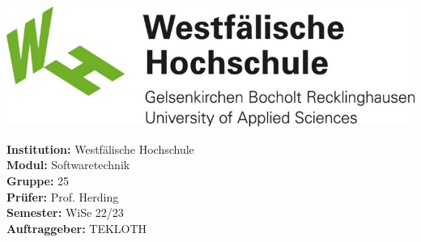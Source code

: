 \begin{titlepage}
    \maketitle
    \vspace{2cm}
    \begin{center}
        \includegraphics[width=\paperwidth/2]{../assets/img/whs}
    \end{center}
    \vspace*{\fill}
    \begin{flushleft}
        \Large{\textbf{Institution:} Westfälische Hochschule}\\
        \Large{\textbf{Modul:} Softwaretechnik} \\
        \Large{\textbf{Gruppe:} 25} \\
        \Large{\textbf{Prüfer:} Prof. Herding}\\
        \Large{\textbf{Semester:} WiSe 22/23}\\
        \Large{\textbf{Auftraggeber:} TEKLOTH}
    \end{flushleft}
\end{titlepage}

